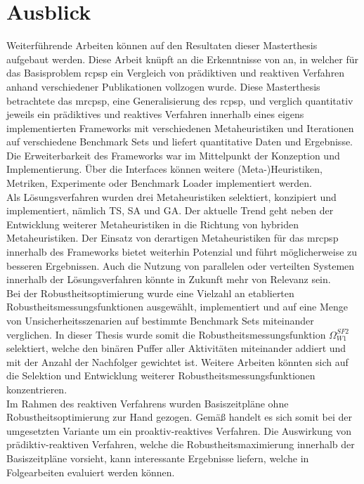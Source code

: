 \section{Ausblick} \label{sec:Ausblick}

Weiterführende Arbeiten können auf den Resultaten dieser Masterthesis aufgebaut werden. Diese Arbeit knüpft an die Erkenntnisse von \cite{brcic_resource_2012} an, in welcher für das Basisproblem \ac{rcpsp} ein Vergleich von prädiktiven und reaktiven Verfahren anhand verschiedener Publikationen vollzogen wurde. Diese Masterthesis betrachtete das \ac{mrcpsp}, eine Generalisierung des \ac{rcpsp}, und verglich quantitativ jeweils ein prädiktives und reaktives Verfahren innerhalb eines eigens implementierten Frameworks mit verschiedenen Metaheuristiken und Iterationen auf verschiedene Benchmark Sets und liefert quantitative Daten und Ergebnisse. \\

Die Erweiterbarkeit des Frameworks war im Mittelpunkt der Konzeption und Implementierung. Über die Interfaces können weitere (Meta-)Heuristiken, Metriken, Experimente oder Benchmark Loader implementiert werden. \\

Als Lösungsverfahren wurden drei Metaheuristiken selektiert, konzipiert und implementiert, nämlich \acl{TS}, \acl{SA} und \acl{GA}. Der aktuelle Trend geht neben der Entwicklung weiterer Metaheuristiken in die Richtung von hybriden Metaheuristiken. Der Einsatz von derartigen Metaheuristiken für das \ac{mrcpsp} innerhalb des Frameworks bietet weiterhin Potenzial und führt möglicherweise zu besseren Ergebnissen. Auch die Nutzung von parallelen oder verteilten Systemen innerhalb der Lösungsverfahren könnte in Zukunft mehr von Relevanz sein. \\

Bei der Robustheitsoptimierung wurde eine Vielzahl an etablierten Robustheitsmessungsfunktionen ausgewählt, implementiert und auf eine Menge von Unsicherheitsszenarien auf bestimmte Benchmark Sets miteinander verglichen. In dieser Thesis wurde somit die Robustheitsmessungsfunktion $\Omega^{SF2}_{W1}$ selektiert, welche den binären Puffer aller Aktivitäten miteinander addiert und mit der Anzahl der Nachfolger gewichtet ist. Weitere Arbeiten könnten sich auf die Selektion und Entwicklung weiterer Robustheitsmessungsfunktionen konzentrieren. \\

Im Rahmen des reaktiven Verfahrens wurden Basiszeitpläne ohne Robustheitsoptimierung zur Hand gezogen. Gemäß \cite[vgl.][S. 404 f.]{brcic_resource_2012} handelt es sich somit bei der umgesetzten Variante um ein proaktiv-reaktives Verfahren. Die Auswirkung von prädiktiv-reaktiven Verfahren, welche die Robustheitsmaximierung innerhalb der Basiszeitpläne vorsieht, kann interessante Ergebnisse liefern, welche in Folgearbeiten evaluiert werden können. \\

